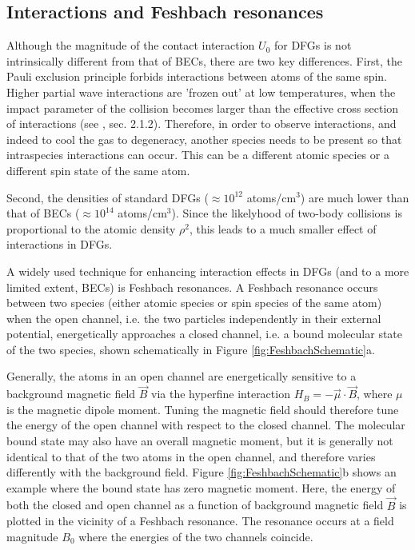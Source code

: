 \subsection{Interactions and Feshbach resonances}\label{sec:Feshbach}
Although the magnitude of the contact interaction $U_0$ for DFGs is not intrinsically different from that of BECs, there are two key differences. First, the Pauli exclusion principle forbids \swave{} interactions between atoms of the same spin. Higher partial wave interactions are 'frozen out' at low temperatures, when the impact parameter of the collision becomes larger than the effective cross section of interactions (see \cite{KetterleDFG}, sec. 2.1.2). Therefore, in order to observe interactions, and indeed to cool the gas to degeneracy, another species needs to be present so that intraspecies \swave{} interactions can occur. This can be a different atomic species or a different spin state of the same atom. 

Second, the densities of standard DFGs ($\approx 10^{12}$ atoms/cm$^3$) are much lower than that of BECs ($\approx 10^{14}$ atoms/cm$^3$). Since the likelyhood of two-body collisions is proportional to the atomic density $\rho^2$, this leads to a much smaller effect of interactions in DFGs.

A widely used technique for enhancing interaction effects in DFGs (and to a more limited extent, BECs) is Feshbach resonances\cite{OHara02,Jochim02,Dieckmann02,Loftus02,Regal03b}. A Feshbach resonance occurs between two species (either atomic species or spin species of the same atom) when the open channel, i.e. the two particles independently in their external potential, energetically approaches a closed channel, i.e. a bound molecular state of the two species, shown schematically in Figure \ref{fig:FeshbachSchematic}a. 

Generally, the atoms in an open channel are energetically sensitive to a background magnetic field $\vec{B}$ via the hyperfine interaction $H_B=-\vec{\mu}\cdot \vec{B}$, where $\mu$ is the magnetic dipole moment. Tuning the magnetic field should therefore tune the energy of the open channel with respect to the closed channel. The molecular bound state may also have an overall magnetic moment, but it is generally not identical to that of the two atoms in the open channel, and therefore varies differently with the background field. Figure \ref{fig:FeshbachSchematic}b shows an example where the bound state has zero magnetic moment. Here, the energy of both the closed and open channel as a function of background magnetic field $\vec{B}$ is plotted in the vicinity of a Feshbach resonance. The resonance occurs at a field magnitude $B_0$ where the energies of the two channels coincide.

